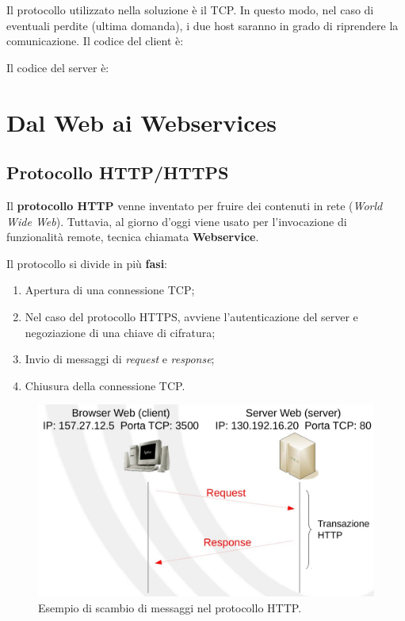 \documentclass[a4paper]{article}
\begin{document}
	\noindent
	Il protocollo utilizzato nella soluzione è il TCP. In questo modo, nel caso di eventuali perdite (ultima domanda), i due host saranno in grado di riprendere la comunicazione. Il codice del client è:
	\newpage
	
	\noindent
	Il codice del server è:
	






	
	\newpage

	\section{Dal Web ai Webservices}
	
	\subsection{Protocollo HTTP/HTTPS}
	
	Il \textcolor{Red3}{\textbf{protocollo HTTP}} venne inventato per fruire dei contenuti in rete (\emph{World Wide Web}). Tuttavia, al giorno d'oggi viene usato per l'invocazione di funzionalità remote, tecnica chiamata \textbf{Webservice}.\newline
	
	\noindent
	Il protocollo si divide in più \textbf{fasi}:
	\begin{enumerate}
		\item Apertura di una connessione TCP;
		
		\item Nel caso del protocollo HTTPS, avviene l'autenticazione del server e negoziazione di una chiave di cifratura;
		
		\item Invio di messaggi di \emph{request} e \emph{response};
		
		\item Chiusura della connessione TCP.
	\end{enumerate}
	\begin{figure}[!htp]
		\centering
		\includegraphics[width=\textwidth]{img/protocollo_http-https.png}
		\caption{Esempio di scambio di messaggi nel protocollo HTTP.}
	\end{figure}\newpage
	
\end{document}
